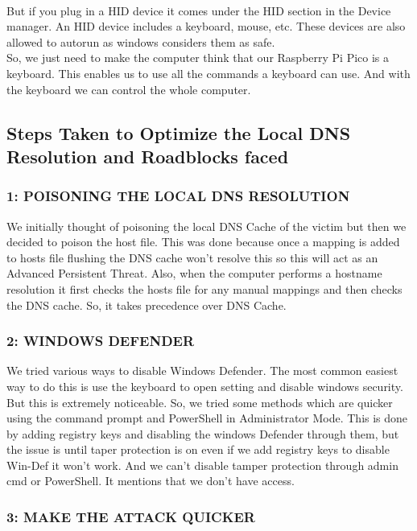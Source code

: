 \documentclass[11pt]{report}
\begin{document}
\\[1em]
But if you plug in a HID device it comes under the HID section in the Device
manager. An HID device includes a keyboard, mouse, etc. These devices are also
allowed to autorun as windows considers them as safe.\\
So, we just need to make the computer think that our Raspberry Pi Pico is a
keyboard. This enables us to use all the commands a keyboard can use. And with
the keyboard we can control the whole computer.
\\[1em]

\subsection*{Steps Taken to Optimize the Local DNS Resolution and Roadblocks faced}
\subsubsection*{1: POISONING THE LOCAL DNS RESOLUTION}

We initially thought of poisoning the local DNS Cache of the victim but then we
decided to poison the host file. This was done because once a mapping is added
to hosts file flushing the DNS cache won't resolve this so this will act as an
Advanced Persistent Threat. Also, when the computer performs a hostname
resolution it first checks the hosts file for any manual mappings and then
checks the DNS cache. So, it takes precedence over DNS Cache.

\subsubsection*{2: WINDOWS DEFENDER}

We tried various ways to disable Windows Defender. The most common easiest way
to do this is use the keyboard to open setting and disable windows security.
But this is extremely noticeable. So, we tried some methods which are quicker
using the command prompt and PowerShell in Administrator Mode. This is done by
adding registry keys and disabling the windows Defender through them, but the
issue is until taper protection is on even if we add registry keys to disable
Win-Def it won't work. And we can't disable tamper protection through admin cmd
or PowerShell. It mentions that we don't have access.

\subsubsection*{3: MAKE THE ATTACK QUICKER}
\end{document}
